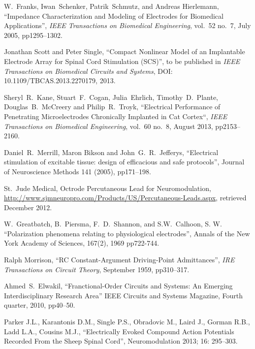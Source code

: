 \documentclass[journal, a4paper]{IEEEtran}
\begin{document}
{\begin{thebibliography}{99}
W.~Franks, Iwan~Schenker, Patrik~Schmutz, and Andreas Hierlemann,
``Impedance Characterization and Modeling of Electrodes for Biomedical Applications'',
\emph{IEEE Transactions on Biomedical Engineering},
vol.~52 no.~7, July 2005, pp1295--1302.

Jonathan Scott and Peter Single,
``Compact Nonlinear Model of an Implantable Electrode Array for Spinal Cord Stimulation (SCS)'',
to be published in
{\em IEEE Transactions on Biomedical Circuits and Systems},
DOI: 10.1109/TBCAS.2013.2270179, 2013.

Sheryl~R.~Kane, Stuart~F.~Cogan, Julia~Ehrlich, Timothy~D.~Plante, Douglas~B.~McCreery and Philip~R.~Troyk,
``Electrical Performance of Penetrating Microelectrodes Chronically Implanted in Cat Cortex``,
{\em IEEE Transactions on Biomedical Engineering},
vol.~60 no.~8, August 2013, pp2153--2160.

Daniel~R.~Merrill, Maron Bikson and John~G.~R.\ Jefferys,
``Electrical stimulation of excitable tissue: design of efficacious and safe protocols'',
Journal of Neuroscience Methods 141 (2005), pp171--198.

St.~Jude Medical, Octrode Percutaneous Lead for Neuromodulation,
\url{http://www.sjmneuropro.com/Products/US/Percutaneous-Leads.aspx},
retrieved December 2012.

W.~Greatbatch, B.~Piersma, F.~D.~Shannon, and S.W.~Calhoon, S. W.
``Polarization phenomena relating to physiological electrodes'',
Annals of the New York Academy of Sciences,
167(2), 1969 pp722-744.

Ralph Morrison,
``RC Constant-Argument Driving-Point Admittances'',
{\em IRE Transactions on Circuit Theory},
September 1959, pp310--317.

Ahmed~S.~Elwakil,
``Franctional-Order Circuits and Systems: An Emerging Interdisciplinary Research Area''
IEEE Circuits and Systems Magazine, Fourth quarter, 2010, pp40--50.

Parker J.L., Karantonis D.M., Single P.S., Obradovic M., Laird J., Gorman R.B., Ladd L.A., Cousins M.J.,
``Electrically Evoked Compound Action Potentials Recorded From the Sheep Spinal Cord'',
Neuromodulation 2013; 16: 295--303.



\end{thebibliography}}
\end{document}
